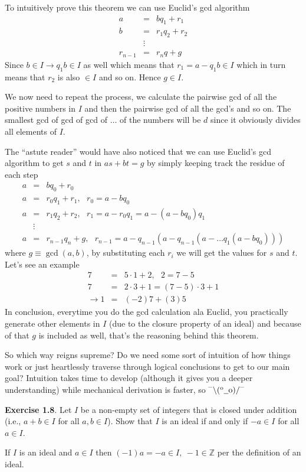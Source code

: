 \documentclass[aps,preprint,preprintnumbers,nofootinbib,showpacs,prd]{revtex4-1}
\newcommand{\nbea}{\begin{eqnarray*}}
\newcommand{\neea}{\end{eqnarray*}}
\newcommand{\dunno}{$ {}^{\mbox {--}}\backslash(^{\rm o}{}\underline{\hspace{0.2cm}}{\rm o})/^{\mbox {--}}$}
\begin{document}
To intuitively prove this theorem we can use Euclid's gcd algorithm
%
\nbea
a & = & bq_1 + r_1 \\
b & = & r_1 q_2 + r_2 \\
& \vdots & \\
r_{n-1} & = & r_n q + g
\neea
%
Since $b \in I \to q_1 b \in I$ as well which means that $r_1 = a - q_1 b \in I$ which in turn means that $r_2$ is also $\in I$ and so on. Hence $g \in I$.

We now need to repeat the process, we calculate the pairwise gcd of all the positive numbers in $I$ and then the pairwise gcd of all the gcd's and so on. The smallest gcd of gcd of gcd of $\dots$ of the numbers will be $d$ since it obviously divides all elements of $I$.

The ``astute reader'' would have also noticed that we can use Euclid's gcd algorithm to get $s$ and $t$ in $as + bt = g$ by simply keeping track the residue of each step
%
\nbea
a & = & bq_0 + r_0 \\
a & = & r_0q_1 + r_1, ~~~ r_0 = a - bq_0\\
a & = & r_1q_2 + r_2, ~~~ r_1 = a - r_0q_1 = a - (a - bq_0)q_1\\
& \vdots & \\
a & = & r_{n-1} q_n + g, ~~~ r_{n-1} = a - q_{n-1}(a - q_{n-1}(a - \dots q_1(a - bq_0)))
\neea
%
where $g \equiv \gcd(a,b)$, by substituting each $r_i$ we will get the values for $s$ and $t$. Let's see an example
%
\nbea
7 & = & 5\cdot 1 + 2, ~~~2 = 7 - 5 \\
7 & = & 2 \cdot 3 + 1 = (7-5)\cdot 3 + 1 \\
\to 1 & = & (-2) 7 + (3) 5 
\neea
%
In conclusion, everytime you do the gcd calculation ala Euclid, you practically generate other elements in $I$ (due to the closure property of an ideal) and because of that $g$ is included as well, that's the reasoning behind this theorem.

So which way reigns supreme? Do we need some sort of intuition of how things work or just heartlessly traverse through logical conclusions to get to our main goal? Intuition takes time to develop (although it gives you a deeper understanding) while mechanical derivation is faster, so \dunno

{\bf Exercise 1.8}. Let $I$ be a non-empty set of integers that is closed under addition (i.e., $a + b \in I$ for all $a, b \in I$). Show that $I$ is an ideal if and only if $-a \in I$ for all $a \in I$.

If $I$ is an ideal and $a \in I$ then $(-1)a = -a \in I, ~-1 \in \mathbb{Z}$ per the definition of an ideal.
\end{document}
